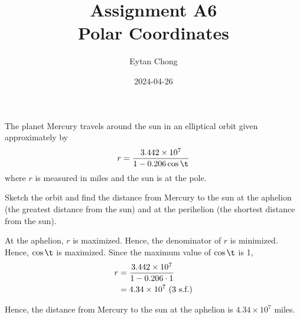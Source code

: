\documentclass{echw}
\title{Assignment A6\\Polar Coordinates}
\author{Eytan Chong}
\date{2024-04-26}
\begin{document}
    \problem{}
        The planet Mercury travels around the sun in an elliptical orbit given approximately by
        \begin{equation*}
            r = \dfrac{3.442 \times 10^7}{1 - 0.206\cos\t}
        \end{equation*}
         where $r$ is measured in miles and the sun is at the pole.

        Sketch the orbit and find the distance from Mercury to the sun at the aphelion (the greatest distance from the sun) and at the perihelion (the shortest distance from the sun).

    \solution
        \begin{center}
        \end{center}

        At the aphelion, $r$ is maximized. Hence, the denominator of $r$ is minimized. Hence, $\cos \t$ is maximized. Since the maximum value of $\cos \t$ is 1,
        \begin{align*}
            r &= \dfrac{3.442 \times 10^7}{1 - 0.206\cdot1}\\
            &= 4.34 \times 10^7 \text{ (3 s.f.)}
        \end{align*}

        Hence, the distance from Mercury to the sun at the aphelion is $4.34 \times 10^7$ miles.

\end{document}
